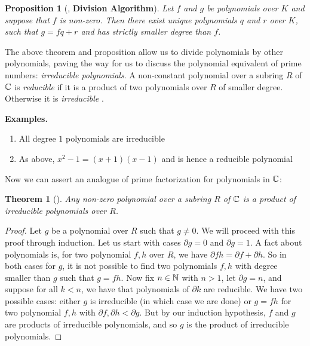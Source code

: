 \documentclass[11pt, a4paper, oneside]{article}
\theoremstyle{plain}
\newtheorem*{thm*}{Theorem}
\theoremstyle{plain}
\newtheorem*{prop*}{Proposition}
\theoremstyle{plain}
\theoremstyle{plain}
\theoremstyle{definition}
\theoremstyle{example}
\begin{document}
\begin{prop*}[{\cite[Prop.\ 3.1]{stewart}}, \textbf{Division Algorithm}] 
Let $f$ and $g$ be polynomials over $K$ and suppose that $f$ is non-zero. Then there exist unique polynomials $q$ and $r$ over $K$, such that $g = fq + r$ and has strictly smaller degree than $f$.
\end{prop*}

The above theorem and proposition allow us to divide polynomials by other polynomials, paving the way for us to discuss the polynomial equivalent of prime numbers: \textit{irreducible polynomials}. A non-constant polynomial over a subring $R$ of $\mathbb{C}$ is \textit{reducible} if it is a product of two polynomials over $R$ of smaller degree. Otherwise it is \textit{irreducible} \cite[\S 3.2, p. 51]{stewart}.

\textbf{Examples.}
\begin{enumerate}
\item All degree $1$ polynomials are irreducible
\item As above, $x^2 - 1 = (x + 1)(x - 1)$ and is hence a reducible polynomial
\end{enumerate}

Now we can assert an analogue of prime factorization for polynomials in $\mathbb{C}$:

\begin{thm*}[{\cite[Thm.\ 3.12]{stewart}}] 
Any non-zero polynomial over a subring $R$ of $\mathbb{C}$ is a product of irreducible polynomials over $R$.
\end{thm*}

\begin{proof}
Let $g$ be a polynomial over $R$ such that $g \neq 0$. We will proceed with this proof through induction. Let us start with cases $\partial g = 0$ and $\partial g = 1$. A fact about polynomials is, for two polynomial $f, h$ over $R$, we have $\partial fh = \partial f + \partial h$. So in both cases for $g$, it is not possible to find two polynomials $f, h$ with degree smaller than $g$ such that $g = fh$. Now fix $n \in \mathbb{N}$ with $n > 1$, let $\partial g = n$, and suppose for all $k < n$, we have that polynomials of $\partial k$ are reducible. We have two possible cases: either $g$ is irreducible (in which case we are done) or $g = fh$ for two polynomial $f, h$ with $\partial f, \partial h < \partial g$. But by our induction hypothesis, $f$ and $g$ are products of irreducible polynomials, and so $g$ is the product of irreducible polynomials.
\end{proof}
\end{document}
